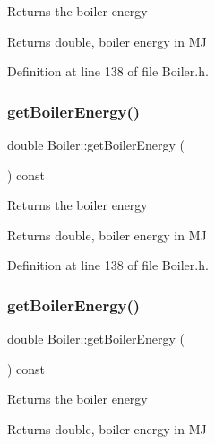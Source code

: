 Returns the boiler energy \begin{DoxyReturn}{Returns}
double, boiler energy in MJ 
\end{DoxyReturn}


Definition at line 138 of file Boiler.\+h.

\mbox{\label{class_boiler_a8cc9ad5f1b36f5dcbcb225e9e3d13a39}} 
\subsubsection{\texorpdfstring{get\+Boiler\+Energy()}{getBoilerEnergy()}\hspace{0.1cm}{\footnotesize\ttfamily [2/3]}}
{\footnotesize\ttfamily double Boiler\+::get\+Boiler\+Energy (\begin{DoxyParamCaption}{ }\end{DoxyParamCaption}) const\hspace{0.3cm}{\ttfamily [inline]}}

Returns the boiler energy \begin{DoxyReturn}{Returns}
double, boiler energy in MJ 
\end{DoxyReturn}


Definition at line 138 of file Boiler.\+h.

\mbox{\label{class_boiler_a8cc9ad5f1b36f5dcbcb225e9e3d13a39}} 
\subsubsection{\texorpdfstring{get\+Boiler\+Energy()}{getBoilerEnergy()}\hspace{0.1cm}{\footnotesize\ttfamily [3/3]}}
{\footnotesize\ttfamily double Boiler\+::get\+Boiler\+Energy (\begin{DoxyParamCaption}{ }\end{DoxyParamCaption}) const\hspace{0.3cm}{\ttfamily [inline]}}

Returns the boiler energy \begin{DoxyReturn}{Returns}
double, boiler energy in MJ 
\end{DoxyReturn}


